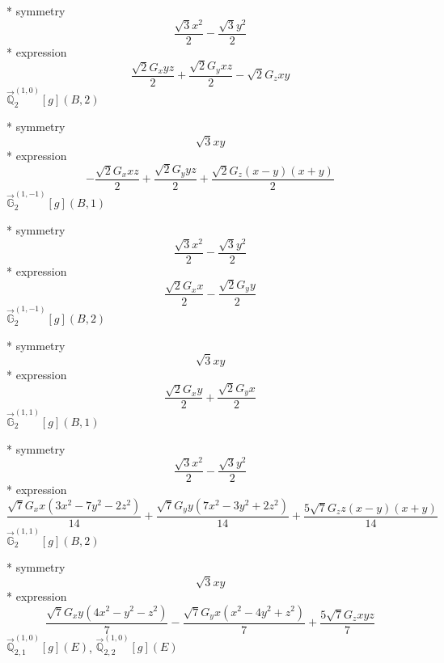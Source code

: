 \documentclass[fleqn,8pt]{jsarticle}
\begin{document}
\noindent\quad ** symmetry
\begin{dmath*}
\frac{\sqrt{3} x^{2}}{2} - \frac{\sqrt{3} y^{2}}{2}
\end{dmath*}
\noindent\quad ** expression
\begin{dmath*}
\frac{\sqrt{2} G_{x} y z}{2} + \frac{\sqrt{2} G_{y} x z}{2} - \sqrt{2} G_{z} x y
\end{dmath*}
\noindent\quad $\vec{\mathbb{Q}}_{2}^{(1,0)}[g](B,2)$

\noindent\quad ** symmetry
\begin{dmath*}
\sqrt{3} x y
\end{dmath*}
\noindent\quad ** expression
\begin{dmath*}
- \frac{\sqrt{2} G_{x} x z}{2} + \frac{\sqrt{2} G_{y} y z}{2} + \frac{\sqrt{2} G_{z} \left(x - y\right) \left(x + y\right)}{2}
\end{dmath*}
\noindent\quad $\vec{\mathbb{G}}_{2}^{(1,-1)}[g](B,1)$

\noindent\quad ** symmetry
\begin{dmath*}
\frac{\sqrt{3} x^{2}}{2} - \frac{\sqrt{3} y^{2}}{2}
\end{dmath*}
\noindent\quad ** expression
\begin{dmath*}
\frac{\sqrt{2} G_{x} x}{2} - \frac{\sqrt{2} G_{y} y}{2}
\end{dmath*}
\noindent\quad $\vec{\mathbb{G}}_{2}^{(1,-1)}[g](B,2)$

\noindent\quad ** symmetry
\begin{dmath*}
\sqrt{3} x y
\end{dmath*}
\noindent\quad ** expression
\begin{dmath*}
\frac{\sqrt{2} G_{x} y}{2} + \frac{\sqrt{2} G_{y} x}{2}
\end{dmath*}
\noindent\quad $\vec{\mathbb{G}}_{2}^{(1,1)}[g](B,1)$

\noindent\quad ** symmetry
\begin{dmath*}
\frac{\sqrt{3} x^{2}}{2} - \frac{\sqrt{3} y^{2}}{2}
\end{dmath*}
\noindent\quad ** expression
\begin{dmath*}
\frac{\sqrt{7} G_{x} x \left(3 x^{2} - 7 y^{2} - 2 z^{2}\right)}{14} + \frac{\sqrt{7} G_{y} y \left(7 x^{2} - 3 y^{2} + 2 z^{2}\right)}{14} + \frac{5 \sqrt{7} G_{z} z \left(x - y\right) \left(x + y\right)}{14}
\end{dmath*}
\noindent\quad $\vec{\mathbb{G}}_{2}^{(1,1)}[g](B,2)$

\noindent\quad ** symmetry
\begin{dmath*}
\sqrt{3} x y
\end{dmath*}
\noindent\quad ** expression
\begin{dmath*}
\frac{\sqrt{7} G_{x} y \left(4 x^{2} - y^{2} - z^{2}\right)}{7} - \frac{\sqrt{7} G_{y} x \left(x^{2} - 4 y^{2} + z^{2}\right)}{7} + \frac{5 \sqrt{7} G_{z} x y z}{7}
\end{dmath*}
\noindent\quad $\vec{\mathbb{Q}}_{2,1}^{(1,0)}[g](E)$, $\vec{\mathbb{Q}}_{2,2}^{(1,0)}[g](E)$
\end{document}
